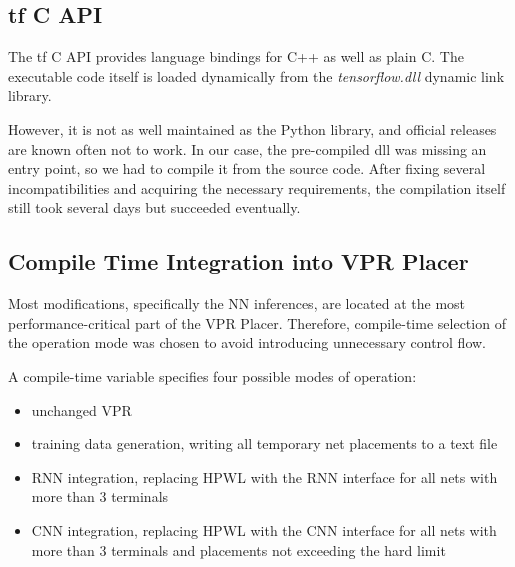 \pagebreak

\subsection{\gls{tf} C API}\label{ch:tf-c-compile}

The \gls{tf} C API provides language bindings for C++ as well as plain C. The executable code itself is loaded dynamically from the \textit{tensorflow.dll} dynamic link library.

However, it is not as well maintained as the Python library, and official releases are known often not to work. In our case, the pre-compiled \gls{dll} was missing an entry point, so we had to compile it from the source code. After fixing several incompatibilities and acquiring the necessary requirements, the compilation itself still took several days but succeeded eventually.

\subsection{Compile Time Integration into \gls{VPR} Placer}

Most modifications, specifically the \gls{NN} inferences, are located at the most performance-critical part of the \gls{VPR} Placer. Therefore, compile-time selection of the operation mode was chosen to avoid introducing unnecessary control flow. 

A compile-time variable specifies four possible modes of operation: 

\begin{itemize}
	\item unchanged \gls{VPR}
	\item training data generation, writing all temporary net placements to a text file
	\item \gls{RNN} integration, replacing \gls{HPWL} with the \gls{RNN} interface for all nets with more than 3 terminals
	\item \gls{CNN} integration, replacing \gls{HPWL} with the \gls{CNN} interface for all nets with more than 3 terminals and placements not exceeding the hard limit
\end{itemize}
